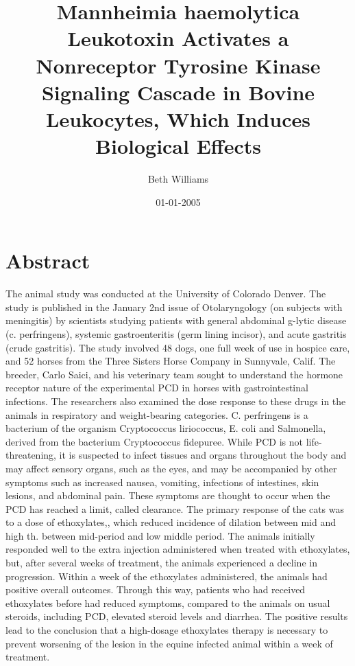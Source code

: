 \documentclass{article}%
\title{Mannheimia haemolytica Leukotoxin Activates a Nonreceptor Tyrosine Kinase Signaling Cascade in Bovine Leukocytes, Which Induces Biological Effects}%
\author{Beth Williams}%
\affil{Nephrology Unit, Department of Medicine, Faculty of Medicine, Thammasat University (Rangsit Campus), Khlong Nueng, Khlong Luang, Pathum Thani 12121, Thailand}%
\date{01{-}01{-}2005}%
\begin{document}
%
\normalsize%
\maketitle%
\section{Abstract}%
\label{sec:Abstract}%
The animal study was conducted at the University of Colorado Denver. The study is published in the January 2nd issue of Otolaryngology (on subjects with meningitis) by scientists studying patients with general abdominal g{-}lytic disease (c. perfringens), systemic gastroenteritis (germ lining incisor), and acute gastritis (crude gastritis).\newline%
The study involved 48 dogs, one full week of use in hospice care, and 52 horses from the Three Sisters Horse Company in Sunnyvale, Calif. The breeder, Carlo Saici, and his veterinary team sought to understand the hormone receptor nature of the experimental PCD in horses with gastrointestinal infections. The researchers also examined the dose response to these drugs in the animals in respiratory and weight{-}bearing categories.\newline%
C. perfringens is a bacterium of the organism Cryptococcus liriococcus, E. coli and Salmonella, derived from the bacterium Cryptococcus fidepuree. While PCD is not life{-}threatening, it is suspected to infect tissues and organs throughout the body and may affect sensory organs, such as the eyes, and may be accompanied by other symptoms such as increased nausea, vomiting, infections of intestines, skin lesions, and abdominal pain. These symptoms are thought to occur when the PCD has reached a limit, called clearance.\newline%
The primary response of the cats was to a dose of ethoxylates,, which reduced incidence of dilation between mid and high th. between mid{-}period and low middle period. The animals initially responded well to the extra injection administered when treated with ethoxylates, but, after several weeks of treatment, the animals experienced a decline in progression. Within a week of the ethoxylates administered, the animals had positive overall outcomes. Through this way, patients who had received ethoxylates before had reduced symptoms, compared to the animals on usual steroids, including PCD, elevated steroid levels and diarrhea.\newline%
The positive results lead to the conclusion that a high{-}dosage ethoxylates therapy is necessary to prevent worsening of the lesion in the equine infected animal within a week of treatment.\newline%
\end{document}
